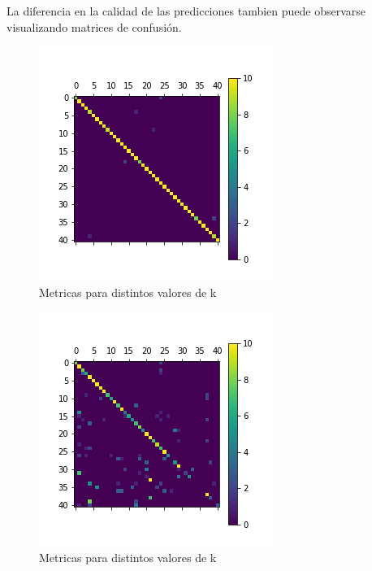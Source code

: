 La diferencia en la calidad de las predicciones tambien puede observarse  visualizando matrices de confusión.

\begin{figure}[H]
    \begin{center}
      \includegraphics[width=0.8\columnwidth]{imagenes/charuli-des/Confusion_matrix_for_k_1.png}
      \caption{Metricas para distintos valores de k}
    \end{center}
\end{figure}

\begin{figure}[H]
    \begin{center}
      \includegraphics[width=0.8\columnwidth]{imagenes/charuli-des/Confusion_matrix_for_k_25.png}
      \caption{Metricas para distintos valores de k}
    \end{center}
\end{figure}

